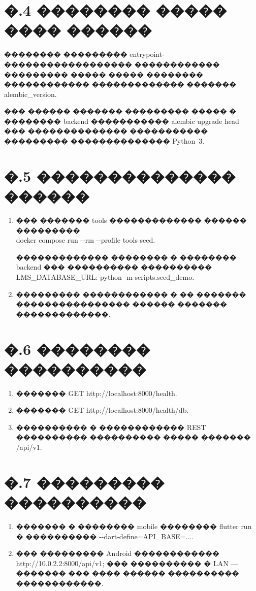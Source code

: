 \section*{�.4 �������� ����� ���� ������}

�������� ��������� entrypoint-������������������ ������������ ��������� ����� ����� �������� ������������ ������������� ������� alembic\_version.

��� ������ ������� ��������� ����� � �������� backend ����������� alembic upgrade head ��� �������������� ����������� ��������� �������������� Python~3\cite{alembic_docs,docker_compose_docs}.

\section*{�.5 �������������� ������}

\begin{enumerate}
  \item ��� ������� tools ������������� ������ ���������
  \\ docker compose run {-}{-}rm {-}{-}profile tools seed.

  ������������� �������� � �������� backend ��� ���������� ���������� LMS\_DATABASE\_URL: python -m scripts.seed\_demo.
  \item ��������� ������������ � �� ������� ���������������� ������ ������� �������������.
\end{enumerate}

\section*{�.6 �������� ����������}

\begin{enumerate}
  \item ������� GET http://localhost:8000/health.
  \item ������� GET http://localhost:8000/health/db.
  \item ���������� � ������������ REST ���������� ���������� ����� ������� /api/v1.
\end{enumerate}

\section*{�.7 ��������� ����������}

\begin{enumerate}
  \item ������� � �������� mobile �������� flutter run � ���������� {-}{-}dart-define=API\_BASE=....
  \item ��� ��������� Android ������������ http://10.0.2.2:8000/api/v1; ��� ���������� � LAN --- ������� ��� ���� ������ ����������-������������.
\end{enumerate}

